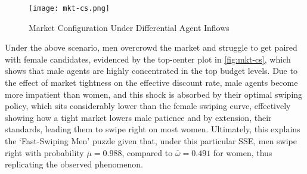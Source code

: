 \begin{figure}[ht]
    \centering
    \caption{Market Configuration Under Differential Agent Inflows}
    \texttt{[image: mkt-cs.png]}
    \label{fig:mkt-cs} 
\end{figure} 

Under the above scenario, men overcrowd the market and struggle to get paired with female candidates, evidenced by the top-center plot in \autoref{fig:mkt-cs}, which shows that male agents are highly concentrated in the top budget levels. 
Due to the effect of market tightness on the effective discount rate, male agents become more impatient than women, and this shock is absorbed by their optimal swiping policy, which sits considerably lower than the female swiping curve, effectively showing how a tight market lowers male patience and by extension, their standards, leading them to swipe right on most women. 
Ultimately, this explains the `Fast-Swiping Men' puzzle given that, under this particular SSE, men swipe right with probability $\overline\mu=0.988$, compared to $\overline\omega=0.491$ for women, thus replicating the observed phenomenon.